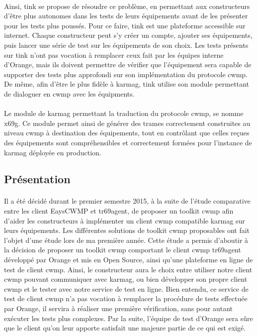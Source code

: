 \documentclass[12pt,a4paper]{report}
\begin{document}
\paragraph*{}Ainsi, \gls{tink} se propose de résoudre ce problème, en permettant aux
constructeurs d’être plus autonomes dans les tests de leurs équipements avant de les
présenter pour les tests plus poussés. Pour ce faire, \gls{tink} est une plateforme accessible sur internet. Chaque constructeur peut s'y créer un compte, ajouter ses équipements, puis lancer une série de test sur les équipements de son choix. Les tests présents sur \gls{tink} n'ont pas vocation à remplacer ceux fait par les équipes interne d'Orange, mais ils doivent permettre de vérifier que l'équipement sera capable de supporter des tests plus approfondi sur son implémentation du protocole \gls{cwmp}. De même, afin d'être le plus fidèle à \gls{karmag}, \gls{tink} utilise son module permettant de dialoguer en \gls{cwmp} avec les équipments. 
\paragraph*{}Le module de \gls{karmag} permettant la traduction du protocole \gls{cwmp}, se nomme \gls{x69g}. Ce module permet ainsi de générer des trames correctement construites au niveau \gls{cwmp} à destination des équipements, tout en contrôlant que celles reçues des équipements sont compréhensibles et correctement formées pour l’instance de \gls{karmag} déployée en production. \\
\subsection{Présentation}
\paragraph*{}Il a été décidé durant le premier semestre 2015, à la suite de l'étude comparative entre les client EaysCWMP et tr69agent, de proposer un toolkit \gls{cwmp}  afin d’aider les constructeurs à implémenter un client \gls{cwmp} compatible \gls{karmag} sur leurs équipements. Les différentes solutions de toolkit \gls{cwmp} proposables ont fait l’objet d’une étude lors de ma première année. Cette étude a permis d’aboutir à la décision de proposer un toolkit \gls{cwmp} comportant le client \gls{cwmp} tr69agent développé par Orange et mis en Open Source, ainsi qu’une plateforme en ligne de test de client \gls{cwmp}. Ainsi, le constructeur aura le choix entre utiliser notre client \gls{cwmp} pouvant communiquer avec \gls{karmag}, ou bien développer son propre client \gls{cwmp} et le tester avec notre service de test en ligne. Bien entendu, ce service de test de client \gls{cwmp} n’a pas vocation à remplacer la procédure de tests effectuée par Orange, il servira à réaliser une première vérification, sans pour autant exécuter les tests plus complexes. Par la suite, l’équipe de test d’Orange sera sûre que le client qu’on leur apporte satisfait une majeure partie de ce qui est exigé.
\end{document}
